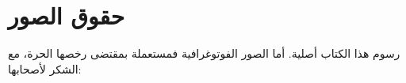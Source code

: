 %
\chapter*{حقوق الصور}

\begingroup\sloppy

رسوم هذا الكتاب أصلية. أما الصور الفوتوغرافية فمستعملة بمقتضى رخصها
الحرة، مع الشكر لأصحابها:

